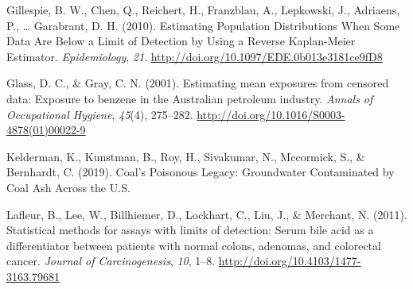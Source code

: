 \documentclass[12pt, twoside]{amherstthesis}
\newlength{\cslhangindent}
\newenvironment{cslreferences}%
  {\setlength{\parindent}{0pt}%
  \everypar{\setlength{\hangindent}{\cslhangindent}}\ignorespaces}%
  {\par}
\begin{document}
\begin{cslreferences}
\leavevmode\hypertarget{ref-Gillespie2010}{}%
Gillespie, B. W., Chen, Q., Reichert, H., Franzblau, A., Lepkowski, J., Adriaens, P., \ldots{} Garabrant, D. H. (2010). Estimating Population Distributions When Some Data Are Below a Limit of Detection by Using a Reverse Kaplan-Meier Estimator. \emph{Epidemiology}, \emph{21}. \url{http://doi.org/10.1097/EDE.0b013e3181ce9fD8}

\leavevmode\hypertarget{ref-Glass2001}{}%
Glass, D. C., \& Gray, C. N. (2001). Estimating mean exposures from censored data: Exposure to benzene in the Australian petroleum industry. \emph{Annals of Occupational Hygiene}, \emph{45}(4), 275--282. \url{http://doi.org/10.1016/S0003-4878(01)00022-9}

\leavevmode\hypertarget{ref-Kelderman2019}{}%
Kelderman, K., Kunstman, B., Roy, H., Sivakumar, N., Mccormick, S., \& Bernhardt, C. (2019). Coal's Poisonous Legacy: Groundwater Contaminated by Coal Ash Across the U.S.

\leavevmode\hypertarget{ref-Lafleur2011}{}%
Lafleur, B., Lee, W., Billhiemer, D., Lockhart, C., Liu, J., \& Merchant, N. (2011). Statistical methods for assays with limits of detection: Serum bile acid as a differentiator between patients with normal colons, adenomas, and colorectal cancer. \emph{Journal of Carcinogenesis}, \emph{10}, 1--8. \url{http://doi.org/10.4103/1477-3163.79681}
\end{cslreferences}
\end{document}
